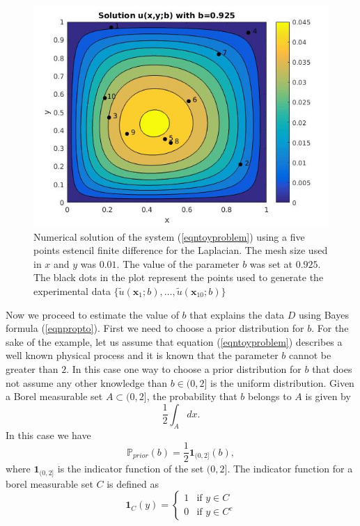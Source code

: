\documentclass[12pt]{book}
\newcommand{\prior}{\mathbb{P}_{prior}}
\newcommand{\x}{\textbf{x}}
\begin{document}
\begin{figure}[H]
\centering
\includegraphics[scale=0.5]{./FigChap3/solu}
\caption{Numerical solution of the system (\ref{eqntoyproblem}) using a five points estencil finite difference
for the Laplacian. The mesh
size used in $x$ and $y$ was $0.01$. The value of the parameter $b$ was set at $0.925$. The black dots
in the plot represent the points used to generate the experimental data 
$\{\tilde{u}(\x_{1};b),\ldots,\tilde{u}(\x_{10};b)\}$}
\label{figsolU}
\end{figure}
Now we proceed to estimate the value of $b$ that explains the data $D$  using Bayes formula (\ref{eqnpropto}).
First we need to choose a prior distribution for $b$. For the sake of the example, let us assume that 
equation (\ref{eqntoyproblem}) describes a well known physical process and it is known that
the parameter $b$ cannot be greater than $2$. In this case one way to choose a prior distribution
for $b$ that does not assume any other knowledge than $b\in (0,2]$ is the uniform distribution. 
Given a Borel measurable set $A\subset(0,2]$, the probability that $b$ belongs to $A$ is given by
\begin{equation*}
\frac{1}{2}\int_{A}dx.
\end{equation*}
In this case we have 
\begin{equation}\label{eqnpriortoyproblem}
\prior(b)=\frac{1}{2}\textbf{1}_{(0,2]}(b),
\end{equation}
where $\textbf{1}_{(0,2]}$ is the indicator function of the set $(0,2]$. The indicator function for a borel measurable set $C$ is
defined as
\begin{equation*}
\textbf{1}_{C}(y)=\left\{
	\begin{array}{ll}
		1 & \mbox{if }	y\in C\\
		0 & \mbox{if }   y\in C^{c}
	\end{array}
\right.
\end{equation*}
\end{document}
